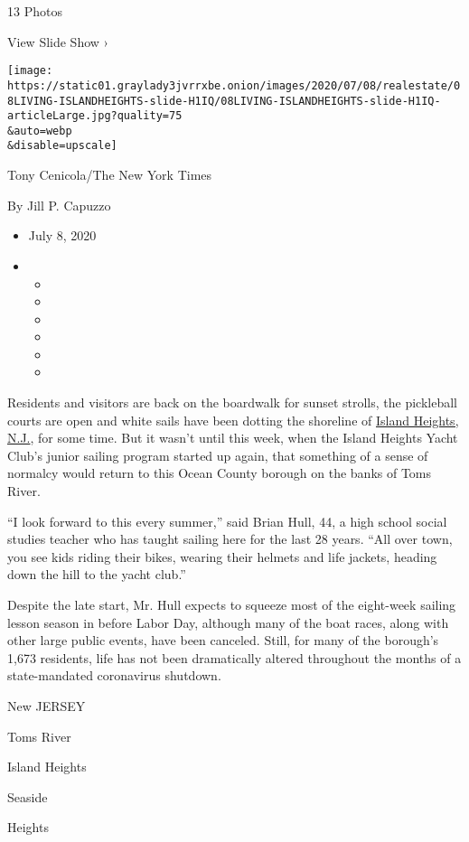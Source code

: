 13 Photos

View Slide Show ›

\texttt{[image: https://static01.graylady3jvrrxbe.onion/images/2020/07/08/realestate/08LIVING-ISLANDHEIGHTS-slide-H1IQ/08LIVING-ISLANDHEIGHTS-slide-H1IQ-articleLarge.jpg?quality=75\\\&auto=webp\\\&disable=upscale]}

Tony Cenicola/The New York Times

By Jill P. Capuzzo

\begin{itemize}
\item
  July 8, 2020
\item
  \begin{itemize}
  \item
  \item
  \item
  \item
  \item
  \item
  \end{itemize}
\end{itemize}

Residents and visitors are back on the boardwalk for sunset strolls, the
pickleball courts are open and white sails have been dotting the
shoreline of \href{http://islandheightsboro.com/}{Island Heights, N.J.},
for some time. But it wasn't until this week, when the Island Heights
Yacht Club's junior sailing program started up again, that something of
a sense of normalcy would return to this Ocean County borough on the
banks of Toms River.

``I look forward to this every summer,'' said Brian Hull, 44, a high
school social studies teacher who has taught sailing here for the last
28 years. ``All over town, you see kids riding their bikes, wearing
their helmets and life jackets, heading down the hill to the yacht
club.''

Despite the late start, Mr. Hull expects to squeeze most of the
eight-week sailing lesson season in before Labor Day, although many of
the boat races, along with other large public events, have been
canceled. Still, for many of the borough's 1,673 residents, life has not
been dramatically altered throughout the months of a state-mandated
coronavirus shutdown.

New JERSEY

Toms River

Island Heights

Seaside

Heights

